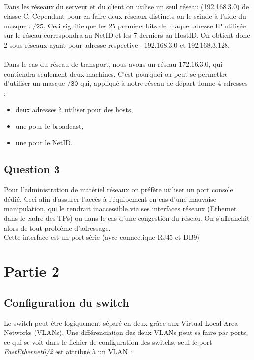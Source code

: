 \documentclass[a4paper,12pt]{article}
\begin{document}
\paragraph{}Dans les réseaux du serveur et du client on utilise un seul réseau (192.168.3.0) de classe C. Cependant pour en faire deux réseaux distincts on le scinde à l'aide du masque : $\mathtt{/25}$. Ceci signifie que les 25 premiers bits de chaque adresse IP utilisée sur le réseau correspondra au NetID et les 7 derniers au HostID. On obtient donc 2 sous-réseaux ayant pour adresse respective : 192.168.3.0 et 192.168.3.128.

\paragraph{}Dans le cas du réseau de transport, nous avons un réseau 172.16.3.0, qui contiendra seulement deux machines. C'est pourquoi on peut se permettre d'utiliser un masque $\mathtt{/30}$ qui, appliqué à notre réseau de départ donne 4 adresses :
\begin{itemize}
\item deux adresses à utiliser pour des hosts,
\item une pour le broadcast,
\item une pour le NetID.
\end{itemize}


\subsection{Question 3}

Pour l'administration de matériel réseaux on préfère utiliser un port console dédié. Ceci afin d'assurer l'accès à l'équipement en cas d'une mauvaise manipulation, qui le rendrait inaccessible via ses interfaces réseaux (Ethernet dans le cadre des TPs) ou dans le cas d'une congestion du réseau. On s'affranchit alors de tout problème d'adressage.\\

Cette interface est un port série (avec connectique RJ45 et DB9)


\section{Partie 2}
\subsection{Configuration du switch}

Le switch peut-être logiquement séparé en deux grâce aux Virtual Local Area Networks (VLANs). Une différenciation des deux VLANs peut se faire par ports, ce qui se voit dans le fichier de configuration des switchs, seul le port \textit{FastEthernet0/2} est attribué à un VLAN :
\end{document}
